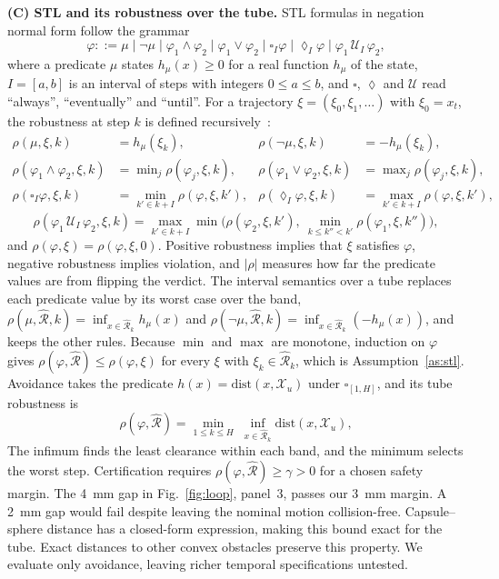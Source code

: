 \documentclass[runningheads]{llncs}
\newcommand{\Rh}{\hat{\mathcal{R}}}
\newcommand{\Xu}{\mathcal{X}_u}
\begin{document}
\textbf{(C) STL and its robustness over the tube.} STL formulas in negation
normal form follow the grammar
\[
\varphi ::= \mu \mid \neg\mu \mid \varphi_1\wedge\varphi_2 \mid
\varphi_1\vee\varphi_2 \mid \square_I\varphi \mid \lozenge_I\varphi \mid
\varphi_1\,\mathcal{U}_I\,\varphi_2 ,
\]
where a predicate $\mu$ states $h_\mu(x)\ge 0$ for a real function $h_\mu$
of the state, $I=[a,b]$ is an interval of steps with integers
$0\le a\le b$, and $\square$, $\lozenge$ and $\mathcal{U}$ read
``always'', ``eventually'' and ``until''. For a trajectory
$\xi=(\xi_0,\xi_1,\dots)$ with $\xi_0=x_t$, the robustness at step $k$ is
defined recursively~\cite{donze2010robust,fainekos2009robustness}:
\begin{align*}
\rho(\mu,\xi,k)&=h_\mu(\xi_k), &
\rho(\neg\mu,\xi,k)&=-h_\mu(\xi_k),\\
\rho(\varphi_1\wedge\varphi_2,\xi,k)&=\min\nolimits_{j}\rho(\varphi_j,\xi,k), &
\rho(\varphi_1\vee\varphi_2,\xi,k)&=\max\nolimits_{j}\rho(\varphi_j,\xi,k),\\
\rho(\square_I\varphi,\xi,k)&=\min_{k'\in k+I}\rho(\varphi,\xi,k'), &
\rho(\lozenge_I\varphi,\xi,k)&=\max_{k'\in k+I}\rho(\varphi,\xi,k'),
\end{align*}
\[
\rho(\varphi_1\,\mathcal{U}_I\,\varphi_2,\xi,k)=\max_{k'\in k+I}
\min\Big(\rho(\varphi_2,\xi,k'),\ \min_{k\le k''<k'}\rho(\varphi_1,\xi,k'')\Big),
\]
and $\rho(\varphi,\xi)=\rho(\varphi,\xi,0)$. Positive robustness implies
that $\xi$ satisfies $\varphi$, negative robustness implies violation, and
$|\rho|$ measures how far the predicate values are from flipping the
verdict. The interval semantics over a tube replaces each predicate value by
its worst case over the band, $\rho(\mu,\Rh,k)=\inf_{x\in\Rh_k}h_\mu(x)$ and
$\rho(\neg\mu,\Rh,k)=\inf_{x\in\Rh_k}(-h_\mu(x))$, and keeps the other
rules. Because $\min$ and $\max$ are monotone, induction on $\varphi$ gives
$\rho(\varphi,\Rh)\le\rho(\varphi,\xi)$ for every $\xi$ with
$\xi_k\in\Rh_k$, which is Assumption~\ref{as:stl}. Avoidance takes the
predicate $h(x)=\mathrm{dist}(x,\Xu)$ under $\square_{[1,H]}$, and its
tube robustness is
\begin{equation}
\rho(\varphi, \Rh) = \min_{1 \le k \le H}\; \inf_{x \in \Rh_k} \mathrm{dist}(x, \Xu),
\label{eq:rho}
\end{equation}
The infimum finds the least clearance within each band, and the minimum
selects the worst step. Certification requires
$\rho(\varphi,\Rh)\ge\gamma>0$ for a chosen safety margin.
The 4~mm gap in Fig.~\ref{fig:loop}, panel~3, passes our 3~mm margin.
A 2~mm gap would fail despite leaving the nominal motion collision-free.
Capsule--sphere distance has a closed-form expression, making this bound
exact for the tube. Exact distances to other convex obstacles preserve
this property. We evaluate only avoidance, leaving richer temporal
specifications untested.
\end{document}
